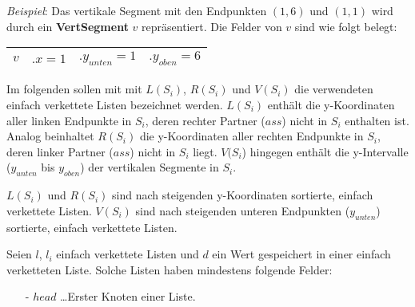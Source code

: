 \documentclass{article}
\begin{document}
\emph{Beispiel}: Das vertikale Segment mit den Endpunkten $(1, 6)$ und $(1, 1)$
wird durch ein {\bfseries VertSegment} $v$ repr{\"a}sentiert. Die Felder von $v$
sind wie folgt belegt:

\begin{center}
\begin{tabular}{l||l|l|l|}
  \hline
  $v$ & $.x = 1$ & $.y_{unten} = 1$ & $.y_{oben} = 6$ \tabularnewline
  \hline
\end{tabular}
\end{center}

%

Im folgenden sollen mit mit $L(S_i)$, $R(S_i)$ und $V(S_i)$ die verwendeten einfach verkettete Listen bezeichnet werden.
$L(S_i)$ enth{\"a}lt die y-Koordinaten aller linken Endpunkte in $S_i$, deren
rechter Partner ($ass$) nicht in $S_i$ enthalten ist. Analog beinhaltet $R(S_i)$
die y-Koordinaten aller rechten Endpunkte in $S_i$, deren linker Partner ($ass$)
nicht in $S_i$ liegt. $V(S_i$) hingegen enth{\"a}lt die y-Intervalle ($y_{unten}$
bis $y_{oben}$) der vertikalen Segmente in $S_i$.

$L(S_i)$ und $R(S_i)$ sind nach steigenden y-Koordinaten sortierte, einfach
verkettete Listen. $V(S_i)$ sind nach steigenden unteren Endpunkten ($y_{unten}$)
sortierte, einfach verkettete Listen.

Seien $l$, $l_i$ einfach verkettete Listen und $d$ ein Wert gespeichert in einer
einfach verketteten Liste. Solche Listen haben mindestens folgende Felder:
\begin{itemize}
  \item[-] $head$ \ldots Erster Knoten einer Liste.
\end{itemize}
\end{document}
